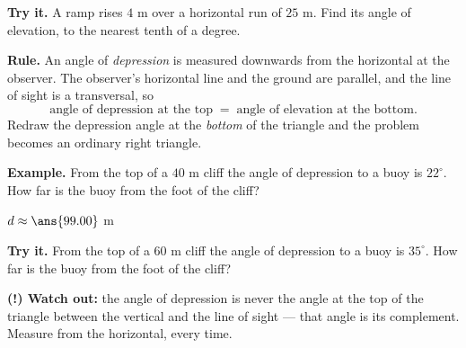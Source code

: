 \documentclass[12pt]{article}
\begin{document}
\begin{tryitbox}
\textbf{Try it.} A ramp rises $4$ m over a horizontal run of $25$ m. Find its
angle of elevation, to the nearest tenth of a degree.\\[2pt]
\end{tryitbox}


\begin{formulabox}
\textbf{Rule.} An angle of \emph{depression} is measured downwards from the
horizontal at the observer. The observer's horizontal line and the ground are
parallel, and the line of sight is a transversal, so
\[ \text{angle of depression at the top} \;=\; \text{angle of elevation at the bottom}. \]
Redraw the depression angle at the \emph{bottom} of the triangle and the problem
becomes an ordinary right triangle.
\end{formulabox}

\begin{examplebox}
\textbf{Example.} From the top of a $40$ m cliff the angle of depression to a
buoy is $22^\circ$. How far is the buoy from the foot of the cliff?

$d \approx \ans{99.00}$ m
\end{examplebox}

\begin{tryitbox}
\textbf{Try it.} From the top of a $60$ m cliff the angle of depression to a
buoy is $35^\circ$. How far is the buoy from the foot of the cliff?\\[2pt]
\end{tryitbox}

\begin{watchoutbox}
\textbf{(!) Watch out:} the angle of depression is never the angle at the top of
the triangle between the vertical and the line of sight --- that angle is its
complement. Measure from the horizontal, every time.
\end{watchoutbox}
\end{document}
